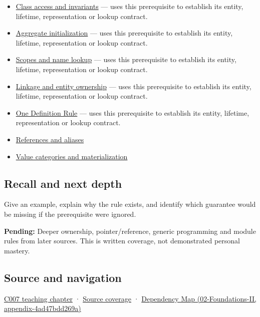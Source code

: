 \begin{itemize}
\tightlist
\item
  \hyperref[appendix-8e5214819615]{Class access and invariants} --- uses this prerequisite to establish its entity, lifetime, representation or lookup contract.
\item
  \hyperref[appendix-b7174c179542]{Aggregate initialization} --- uses this prerequisite to establish its entity, lifetime, representation or lookup contract.
\item
  \hyperref[appendix-b12b31759da1]{Scopes and name lookup} --- uses this prerequisite to establish its entity, lifetime, representation or lookup contract.
\item
  \hyperref[appendix-74a0ec818c18]{Linkage and entity ownership} --- uses this prerequisite to establish its entity, lifetime, representation or lookup contract.
\item
  \hyperref[appendix-49d27bc9d9a5]{One Definition Rule} --- uses this prerequisite to establish its entity, lifetime, representation or lookup contract.
\item
  \hyperref[appendix-d6d562ca9fbb]{References and aliases}
\item
  \hyperref[appendix-1121b30eaeb0]{Value categories and materialization}
\end{itemize}

\subsection{Recall and next depth}\label{appendix-2e4d494c2d94-recall-and-next-depth}

Give an example, explain why the rule exists, and identify which guarantee would be missing if the prerequisite were ignored.

\textbf{Pending:} Deeper ownership, pointer/reference, generic programming and module rules from later sources. This is written coverage, not demonstrated personal mastery.

\subsection{Source and navigation}\label{appendix-2e4d494c2d94-source-and-navigation}

\hyperref[01-foundations-i-ch002-promises-become-definitions]{C007 teaching chapter} · \hyperref[appendix-fd090d982a15-m007---parts-101-112]{Source coverage} · \href{../02-Foundations-II/main.pdf\#nameddest=appendix-4ad47bdd269a}{Dependency Map (02-Foundations-II, appendix-4ad47bdd269a)}
